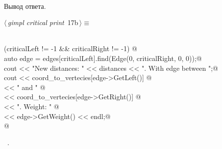 \documentclass[12pt]{article}
\begin{document}
\paragraph{}
Вывод ответа.
\begin{flushleft} \small
\begin{minipage}{\linewidth}\label{scrap33}\raggedright\small
{} $\langle\,${\itshape gimpl critical print}\nobreak\ {\footnotesize {17b}}$\,\rangle\equiv$
\vspace{-1ex}
\begin{list}{}{} \item
\mbox{}\verb@@\\
\mbox{}\verb@if (criticalLeft != -1 && criticalRight != -1) {@\\
\mbox{}\verb@    auto edge = edges[criticalLeft].find(Edge(0, criticalRight, 0, 0));@\\
\mbox{}\verb@    cout << "New distances: " << distances << ". With edge between ";@\\
\mbox{}\verb@    cout << coord_to_vertecies[edge->GetLeft()] @\\
\mbox{}\verb@      << " and " @\\
\mbox{}\verb@      << coord_to_vertecies[edge->GetRight()] @\\
\mbox{}\verb@      << ". Weight: " @\\
\mbox{}\verb@      << edge->GetWeight() << endl;@\\
\mbox{}\verb@} @\\
\mbox{}\verb@@{\NWsep}
\end{list}
\vspace{-1.5ex}
\footnotesize
\begin{list}{}{\setlength{\itemsep}{-\parsep}\setlength{\itemindent}{-\leftmargin}}
\item \NWtxtMacroRefIn\ .

\item{}
\end{list}
\end{minipage}\vspace{4ex}
\end{flushleft}
\end{document}
